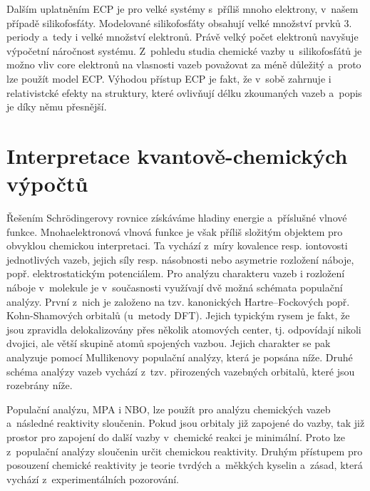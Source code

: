 \documentclass[
digital, %
table,   %
lof,     %
lot,     %
oneside,
]{fithesis3}
\begin{document}
Dalším uplatněním ECP je pro velké systémy s~příliš mnoho elektrony, v~našem případě silikofosfáty. Modelované silikofosfáty obsahují velké množství prvků 3. periody a~tedy i velké množství elektronů. Právě velký počet elektronů navyšuje výpočetní náročnost systému. Z~pohledu studia chemické vazby u~silikofosfátů je možno vliv core elektronů na vlasnosti vazeb považovat za méně důležitý a~proto lze použít model ECP. Výhodou přístup ECP je fakt, že v~sobě zahrnuje i relativistcké efekty na struktury, které ovlivňují délku zkoumaných vazeb a~popis je díky němu přesnější.

\section{Interpretace kvantově-chemických výpočtů}
Řešením Schrödingerovy rovnice získáváme hladiny energie a~příslušné vlnové funkce. Mnohaelektronová vlnová funkce je však příliš složitým objektem pro obvyklou chemickou interpretaci. Ta vychází z~míry kovalence resp. iontovosti jednotlivých vazeb, jejich síly resp. násobnosti nebo asymetrie rozložení náboje, popř. elektrostatickým potenciálem. Pro analýzu charakteru vazeb i rozložení náboje v~molekule je v~současnosti využívají dvě možná schémata populační analýzy. První z~nich je založeno na tzv. kanonických Hartre--Fockových popř. Kohn-Shamových orbitalů (u~metody DFT). Jejich typickým rysem je fakt, že jsou zpravidla delokalizovány přes několik atomových center, tj. odpovídají nikoli dvojici, ale větší skupině atomů spojených vazbou. Jejich charakter se pak analyzuje pomocí Mullikenovy populační analýzy, která je popsána níže. Druhé schéma analýzy vazeb vychází z~tzv. přirozených vazebných orbitalů, které jsou rozebrány níže.

Populační analýzu, MPA i NBO, lze použít pro analýzu chemických vazeb a~následné reaktivity sloučenin. Pokud jsou orbitaly již zapojené do vazby, tak již prostor pro zapojení do další vazby v~chemické reakci je minimální. Proto lze z~populační analýzy sloučenin určit chemickou reaktivity. Druhým přístupem pro posouzení chemické reaktivity je teorie tvrdých a~měkkých kyselin a~zásad, která vychází z~experimentálních pozorování.
\end{document}
